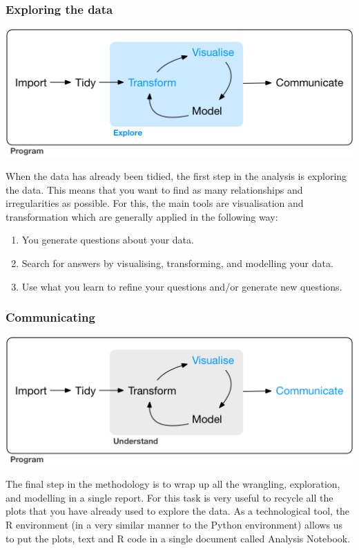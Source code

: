 \documentclass[]{book}
\providecommand{\tightlist}{%
  \setlength{\itemsep}{0pt}\setlength{\parskip}{0pt}}
\begin{document}
\subsubsection{Exploring the data}\label{exploring-the-data}

\includegraphics[width=7.18in]{diagrams/data-science-explore}

When the data has already been tidied, the first step in the analysis is
exploring the data. This means that you want to find as many
relationships and irregularities as possible. For this, the main tools
are visualisation and transformation which are generally applied in the
following way:

\begin{enumerate}
\def\labelenumi{\arabic{enumi}.}
\tightlist
\item
  You generate questions about your data.
\item
  Search for answers by visualising, transforming, and modelling your
  data.
\item
  Use what you learn to refine your questions and/or generate new
  questions.
\end{enumerate}

\subsubsection{Communicating}\label{communicating}

\includegraphics[width=7.18in]{diagrams/data-science-communicate}

The final step in the methodology is to wrap up all the wrangling,
exploration, and modelling in a single report. For this task is very
useful to recycle all the plots that you have already used to explore
the data. As a technological tool, the R environment (in a very similar
manner to the Python environment) allows us to put the plots, text and R
code in a single document called Analysis Notebook.
\end{document}
